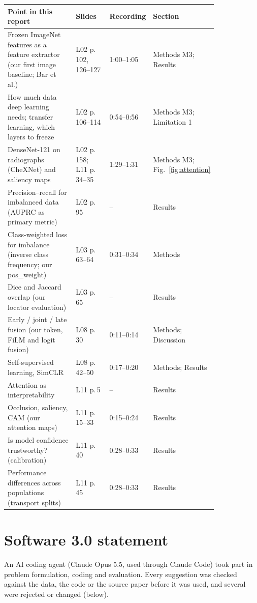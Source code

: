 \begin{table}[!htbp]
  \centering
  \small
  \setlength{\tabcolsep}{4pt}
  \begin{tabular}{@{}R{0.42\linewidth}R{0.2\linewidth}lR{0.2\linewidth}@{}}
    \toprule
    Point in this report & Slides & Recording & Section \\
    \midrule
    Frozen ImageNet features as a feature extractor (our first image baseline; Bar et al.) & L02 p.\,102, 126--127 & 1:00--1:05 & Methods M3; Results \\
    How much data deep learning needs; transfer learning, which layers to freeze & L02 p.\,106--114 & 0:54--0:56 & Methods M3; Limitation 1 \\
    DenseNet-121 on radiographs (CheXNet) and saliency maps & L02 p.\,158; L11 p.\,34--35 & 1:29--1:31 & Methods M3; Fig.~\ref{fig:attention} \\
    Precision--recall for imbalanced data (AUPRC as primary metric) & L02 p.\,95 & -- & Results \\
    Class-weighted loss for imbalance (inverse class frequency; our pos\_weight) & L03 p.\,63--64 & 0:31--0:34 & Methods \\
    Dice and Jaccard overlap (our locator evaluation) & L03 p.\,65 & -- & Results \\
    Early / joint / late fusion (our token, FiLM and logit fusion) & L08 p.\,30 & 0:11--0:14 & Methods; Discussion \\
    Self-supervised learning, SimCLR & L08 p.\,42--50 & 0:17--0:20 & Methods; Results \\
    Attention as interpretability & L11 p.\,5 & -- & Results \\
    Occlusion, saliency, CAM (our attention maps) & L11 p.\,15--33 & 0:15--0:24 & Results \\
    Is model confidence trustworthy? (calibration) & L11 p.\,40 & 0:28--0:33 & Results \\
    Performance differences across populations (transport splits) & L11 p.\,45 & 0:28--0:33 & Results \\
    \bottomrule
  \end{tabular}
\end{table}

\section{Software 3.0 statement}
An AI coding agent (Claude Opus 5.5, used through Claude Code) took part in problem formulation, coding and evaluation.
Every suggestion was checked against the data, the code or the source paper before it was used, and several were rejected
or changed (below).

